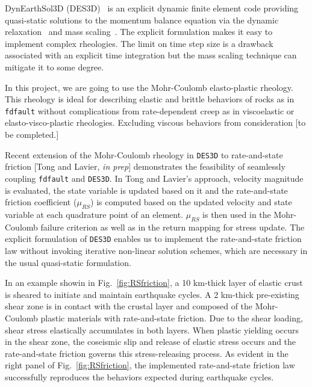 \documentclass[11pt]{article} %
\begin{document}
    

    DynEarthSol3D (DES3D)~\citep{Choi2013,Tan2013,Ta2015,Logan2017} is an explicit dynamic finite element code providing quasi-static solutions to the momentum balance equation via the dynamic relaxation~\citep{Cundall1989} and mass scaling~\citep[e.g.][]{Chung1998}. The explicit formulation makes it easy to implement complex rheologies. The limit on time step size is a drawback associated with an explicit time integration but the mass scaling technique can mitigate it to some degree.
    
    In this project, we are going to use the Mohr-Coulomb elasto-plastic rheology. This rheology is ideal for describing elastic and brittle behaviors of rocks as in \texttt{fdfault} without complications from rate-dependent creep as in viscoelastic or elasto-visco-plastic rheologies. Excluding viscous behaviors from consideration [to be completed.]
    
    Recent extension of the Mohr-Coulomb rheology in \texttt{DES3D} to rate-and-state friction [Tong and Lavier, \emph{in prep}] demonstrates the feasibility of seamlessly coupling \texttt{fdfault} and \texttt{DES3D}. In Tong and Lavier's approach, velocity magnitude is evaluated, the state variable is updated based on it and the rate-and-state friction coefficient ($\mu_{RS}$) is computed based on the updated velocity and state variable at each quadrature point of an element. $\mu_{RS}$ is then used in the Mohr-Coulomb failure criterion as well as in the return mapping for stress update. The explicit formulation of \texttt{DES3D} enables us to implement the rate-and-state friction law without invoking iterative non-linear solution schemes, which are necessary in the usual quasi-static formulation.
    
    In an example showin in Fig.~\ref{fig:RSfriction}, a 10 km-thick layer of elastic crust is sheared to initiate and maintain earthquake cycles. A 2 km-thick pre-existing shear zone is in contact with the crustal layer and composed of the Mohr-Coulomb plastic materials with rate-and-state friction. Due to the shear loading, shear stress elastically accumulates in both layers. When plastic yielding occurs in the shear zone, the coseismic slip and release of elastic stress occurs and the rate-and-state friction governs this stress-releasing process. As evident in the right panel of Fig.~\ref{fig:RSfriction}, the implemented rate-and-state friction law successfully reproduces the behaviors expected during earthquake cycles.
    
\end{document}
